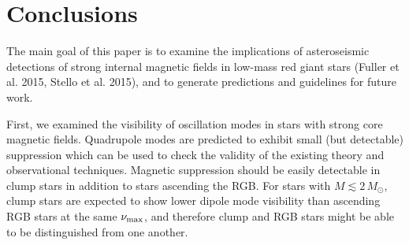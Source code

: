 \section{Conclusions}
\label{conclusion}

The main goal of this paper is to examine the implications of asteroseismic detections of strong internal magnetic fields in low-mass red giant stars (Fuller et al. 2015, Stello et al. 2015), and to generate predictions and guidelines for future work. 

First, we examined the visibility of oscillation modes in stars with strong core magnetic fields. Quadrupole modes are predicted to exhibit small (but detectable) suppression which can be used to check the validity of the existing theory and observational techniques. Magnetic suppression should be easily detectable in clump stars in addition to stars ascending the RGB. For stars with $M \lesssim 2 \, M_\odot$, clump stars are expected to show lower dipole mode visibility than ascending RGB stars at the same $\nu_{\rm max}$, and therefore clump and RGB stars might be able to be distinguished from one another.

